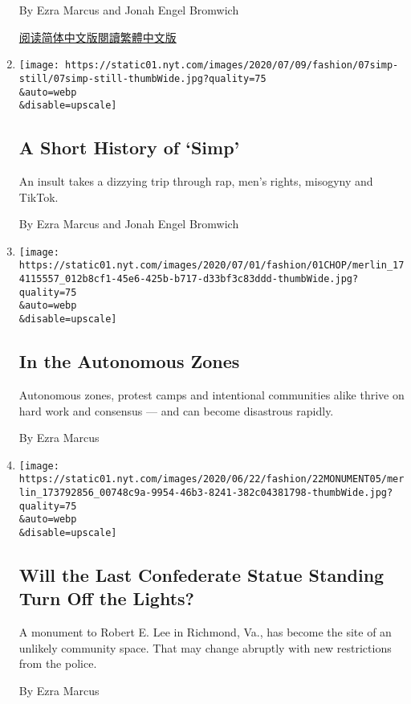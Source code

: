 \begin{enumerate}
  By Ezra Marcus and Jonah Engel Bromwich

  \href{https://cn.nytimes.com/education/20200713/harvard-students-coronavirus/}{阅读简体中文版}\href{https://cn.nytimes.com/education/20200713/harvard-students-coronavirus/zhh-hant/}{閱讀繁體中文版}
\item
  \href{/2020/07/07/style/simp-history-slang.html}{}

  \texttt{[image: https://static01.nyt.com/images/2020/07/09/fashion/07simp-still/07simp-still-thumbWide.jpg?quality=75\\\&auto=webp\\\&disable=upscale]}

  \hypertarget{a-short-history-of-simp}{%
  \subsection{A Short History of `Simp'}\label{a-short-history-of-simp}}

  An insult takes a dizzying trip through rap, men's rights, misogyny
  and TikTok.

  By Ezra Marcus and Jonah Engel Bromwich
\item
  \href{/2020/07/01/style/autonomous-zone-anarchist-community.html}{}

  \texttt{[image: https://static01.nyt.com/images/2020/07/01/fashion/01CHOP/merlin\_174115557\_012b8cf1-45e6-425b-b717-d33bf3c83ddd-thumbWide.jpg?quality=75\\\&auto=webp\\\&disable=upscale]}

  \hypertarget{in-the-autonomous-zones}{%
  \subsection{In the Autonomous Zones}\label{in-the-autonomous-zones}}

  Autonomous zones, protest camps and intentional communities alike
  thrive on hard work and consensus --- and can become disastrous
  rapidly.

  By Ezra Marcus
\item
  \href{/2020/06/23/style/statue-richmond-lee.html}{}

  \texttt{[image: https://static01.nyt.com/images/2020/06/22/fashion/22MONUMENT05/merlin\_173792856\_00748c9a-9954-46b3-8241-382c04381798-thumbWide.jpg?quality=75\\\&auto=webp\\\&disable=upscale]}

  \hypertarget{will-the-last-confederate-statue-standing-turn-off-the-lights}{%
  \subsection{Will the Last Confederate Statue Standing Turn Off the
  Lights?}\label{will-the-last-confederate-statue-standing-turn-off-the-lights}}

  A monument to Robert E. Lee in Richmond, Va., has become the site of
  an unlikely community space. That may change abruptly with new
  restrictions from the police.

  By Ezra Marcus
\end{enumerate}

